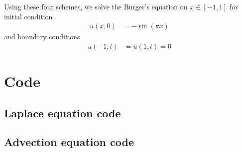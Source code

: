 \documentclass[twocolumn]{myarticle}
\begin{document}
Using these four schemes, we solve the Burger's equation on $ x \in [-1, 1] $ for initial condition
\begin{align}
    u(x, 0) &= - \sin( \pi x)
\end{align}
and boundary conditions
\begin{align}
    u(-1, t) &= u(1, t) = 0
\end{align}




\onecolumn



\section{Code}
\label{sec:code}

\subsection{Laplace equation code}
\label{subsec:laplace_equation_code}


\vspace{10pt}

\subsection{Advection equation code}
\label{subsec:advection_equation_code}


\vspace{10pt}
\end{document}
